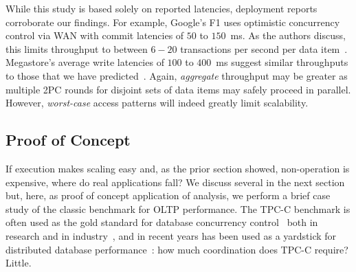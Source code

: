 While this study is based solely on reported latencies, deployment
reports corroborate our findings. For example, Google's F1 uses
optimistic concurrency control via WAN with commit latencies of $50$
to $150$~ms. As the authors discuss, this limits throughput to between
$6-20$ transactions per second per data item~\cite{f1}. Megastore's
average write latencies of $100$ to $400$~ms suggest similar
throughputs to those that we have predicted~\cite{megastore}. Again,
\textit{aggregate} throughput may be greater as multiple 2PC rounds
for disjoint sets of data items may safely proceed in
parallel. However, \textit{worst-case} access patterns will indeed
greatly limit scalability.

\subsection{Proof of Concept}

If \cfree execution makes scaling easy and, as the prior section
showed, non-\iconfluent operation is expensive, where do real
applications fall? We discuss several in the next section but, here,
as proof of concept application of \cfreedom analysis, we perform a
brief case study of the classic benchmark for OLTP performance. The
TPC-C benchmark is often used as the gold standard for database
concurrency control~\cite{oltpbench} both in research and in
industry~\cite{tpcc}, and in recent years has been used as a yardstick
for distributed database performance~\cite{calvin,hstore,silo}: how
much coordination does TPC-C require? Little.

